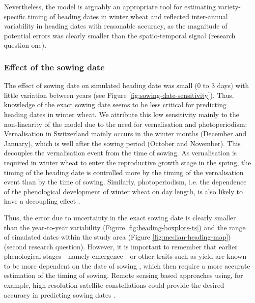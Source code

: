 Nevertheless, the model is arguably an appropriate tool for estimating variety-specific timing of heading dates in winter wheat and reflected inter-annual variability in heading dates with reasonable accuracy, as the magnitude of potential errors was clearly smaller than the spatio-temporal signal (research question one).

\subsubsection{Effect of the sowing date}
The effect of sowing date on simulated heading date was small (0 to 3 days) with little variation between years (see Figure \ref{fig:sowing-date-sensitivity}). Thus, knowledge of the exact sowing date seems to be less critical for predicting heading dates in winter wheat. We attribute this low sensitivity mainly to the non-linearity of the model due to the need for vernalisation and photoperiodism: Vernalisation in Switzerland mainly occurs in the winter months (December and January), which is well after the sowing period (October and November). This decouples the vernalisation event from the time of sowing. As vernalisation is required in winter wheat to enter the reproductive growth stage in the spring, the timing of the heading date is controlled more by the timing of the vernalisation event than by the time of sowing. Similarly, photoperiodism, i.e. the dependence of the phenological development of winter wheat on day length, is also likely to have a decoupling effect \cite{fedorov_photoperiodism_1976}.

Thus, the error due to uncertainty in the exact sowing date is clearly smaller than the year-to-year variability (Figure \ref{fig:heading-boxplots-ts}) and the range of simulated dates within the study area (Figure \ref{fig:median-heading-map}) (second research question). However, it is important to remember that earlier phenological stages - namely emergence - or other traits such as yield are known to be more dependent on the date of sowing \citep{ceglar_improving_2019, dueri_simulation_2022}, which then require a more accurate estimation of the timing of sowing. Remote sensing based approaches using, for example, high resolution satellite constellations could provide the desired accuracy in predicting sowing dates \citep{sadeh_sowing_2019}.

